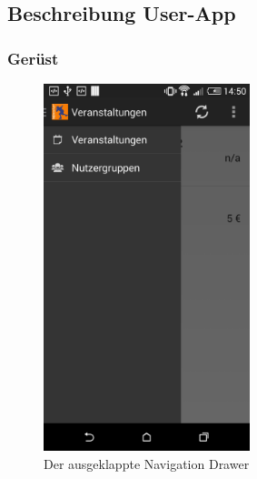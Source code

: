 \subsection{Beschreibung User-App}
\subsubsection{Gerüst}

\begin{figure}[htb]
\centering
\includegraphics[width=6cm]{graphics/navigation_drawer.png}
\caption{Der ausgeklappte Navigation Drawer}
\label{fig:navigation_drawer}
\end{figure}

